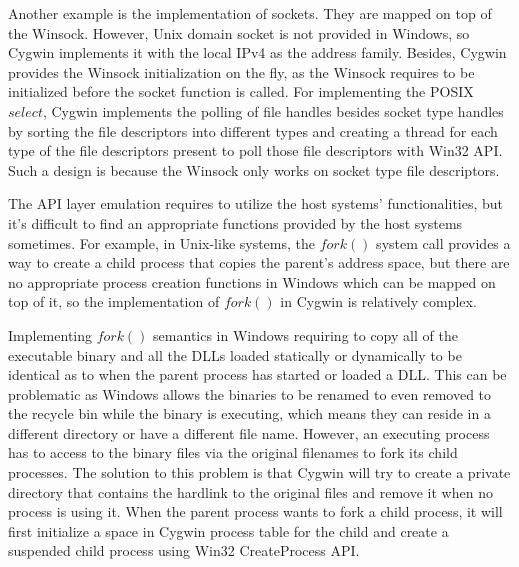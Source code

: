 Another example is the implementation of sockets. They are mapped on top of the Winsock. However, Unix domain socket is not provided in Windows, so Cygwin implements it with the local IPv4 as the address family. Besides, Cygwin provides the Winsock initialization on the fly, as the Winsock requires to be initialized before the socket function is called. For implementing the POSIX $select$, Cygwin implements the polling of file handles besides socket type handles by sorting the file descriptors into different types and creating a thread for each type of the file descriptors present to poll those file descriptors with Win32 API. Such a design is because the Winsock only works on socket type file descriptors.


The API layer emulation requires to utilize the host systems' functionalities, but it's difficult to find an appropriate functions provided by the host systems sometimes. For example, in Unix-like systems, the $fork()$ system call provides a way to create a child process that copies the parent's address space, but there are no appropriate process creation functions in Windows which can be mapped on top of it, so the implementation of $fork()$ in Cygwin is relatively complex.  

Implementing $fork()$ semantics in Windows requiring to copy all of the executable binary and all the DLLs loaded statically or dynamically to be identical as to when the parent process has started or loaded a DLL. This can be problematic as Windows allows the binaries to be renamed to even removed to the recycle bin while the binary is executing, which means they can reside in a different directory or have a different file name. However, an executing process has to access to the binary files via the original filenames to fork its child processes. The solution to this problem is that Cygwin will try to create a private directory that contains the hardlink to the original files and remove it when no process is using it. When the parent process wants to fork a child process, it will first initialize a space in Cygwin process table for the child and create a suspended child process using Win32 CreateProcess API. 

